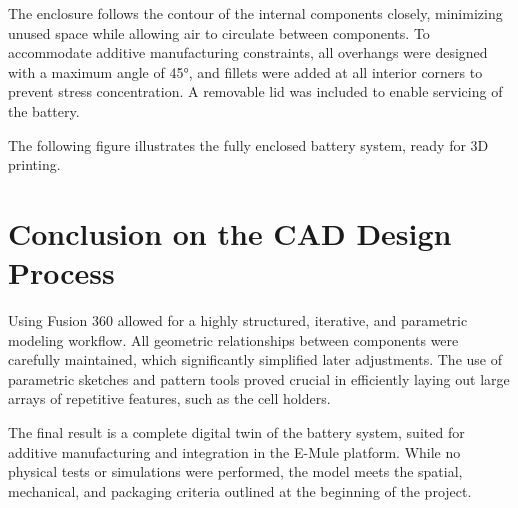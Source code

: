 The enclosure follows the contour of the internal components closely, minimizing unused space while allowing air to circulate between components. To accommodate additive manufacturing constraints, all overhangs were designed with a maximum angle of 45°, and fillets were added at all interior corners to prevent stress concentration. A removable lid was included to enable servicing of the battery.

The following figure illustrates the fully enclosed battery system, ready for 3D printing.


\addtocounter{page}{1}

\section{Conclusion on the CAD Design Process}

Using Fusion 360 allowed for a highly structured, iterative, and parametric modeling workflow. All geometric relationships between components were carefully maintained, which significantly simplified later adjustments. The use of parametric sketches and pattern tools proved crucial in efficiently laying out large arrays of repetitive features, such as the cell holders.

The final result is a complete digital twin of the battery system, suited for additive manufacturing and integration in the E-Mule platform. While no physical tests or simulations were performed, the model meets the spatial, mechanical, and packaging criteria outlined at the beginning of the project.

